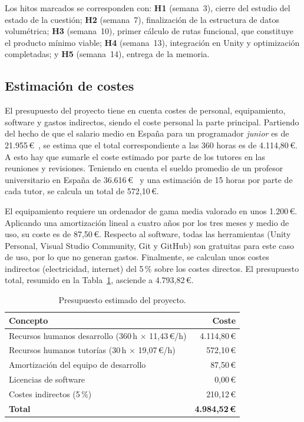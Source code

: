 Los hitos marcados se corresponden con: \textbf{H1} (semana~3), cierre del estudio del estado de la cuestión; \textbf{H2} (semana~7), finalización de la estructura de datos volumétrica; \textbf{H3} (semana~10), primer cálculo de rutas funcional, que constituye el producto mínimo viable; \textbf{H4} (semana~13), integración en Unity y optimización completadas; y \textbf{H5} (semana~14), entrega de la memoria.

\subsection{Estimación de costes}

El presupuesto del proyecto tiene en cuenta costes de personal, equipamiento, software y gastos indirectos, siendo el coste personal la parte principal.
Partiendo del hecho de que el salario medio en España para un programador \textit{junior} es de 21.955\,\euro~\cite{Indeed_SueldosProgramadorJunior}, se estima que el total correspondiente a las 360 horas es de 4.114,80\,\euro.
A esto hay que sumarle el coste estimado por parte de los tutores en las reuniones y revisiones.
Teniendo en cuenta el sueldo promedio de un profesor universitario en España de 36.616\,\euro~\cite{Indeed_SueldosProfesorUniversitario} y una estimación de 15 horas por parte de cada tutor, se calcula un total de 572,10\,\euro.

El equipamiento requiere un ordenador de gama media valorado en unos 1.200\,\euro.
Aplicando una amortización lineal a cuatro años por los tres meses y medio de uso, su coste es de 87,50\,\euro.
Respecto al software, todas las herramientas (Unity Personal, Visual Studio Community, Git y GitHub) son gratuitas para este caso de uso, por lo que no generan gastos.
Finalmente, se calculan unos costes indirectos (electricidad, internet) del 5\,\% sobre los costes directos.
El presupuesto total, resumido en la Tabla~\ref{tab:presupuesto}, asciende a 4.793,82\,\euro.

\begin{table}[htp]
  \centering
  \begin{tabular}{l|r}
  \rowcolor{udcpink!25}
  \textbf{Concepto} & \textbf{Coste} \\\hline
  Recursos humanos desarrollo (360\,h $\times$ 11,43\,\euro/h) & 4.114,80\,\euro \\
  Recursos humanos tutorías (30\,h $\times$ 19,07\,\euro/h) & 572,10\,\euro \\
  Amortización del equipo de desarrollo & 87,50\,\euro \\
  Licencias de software & 0,00\,\euro \\
  Costes indirectos (5\,\%) & 210,12\,\euro \\\hline
  \textbf{Total} & \textbf{4.984,52\,\euro} \\
  \end{tabular}
  \caption{Presupuesto estimado del proyecto.}
  \label{tab:presupuesto}
\end{table}

